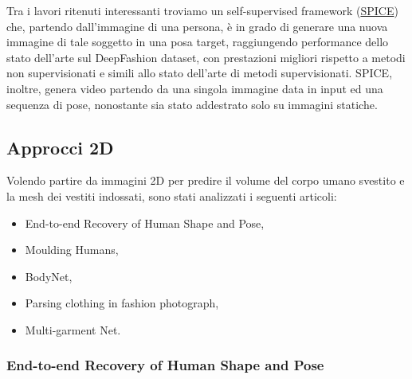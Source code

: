 Tra i lavori ritenuti interessanti troviamo un self-supervised framework (\href{https://openaccess.thecvf.com/content/ICCV2021/papers/Sanyal_Learning_Realistic_Human_Reposing_Using_Cyclic_Self-Supervision_With_3D_Shape_ICCV_2021_paper.pdf}{SPICE}) \cite{sanyal2021learning} che, partendo dall’immagine di una persona, è in grado di generare una nuova immagine di tale soggetto in una posa target, raggiungendo performance dello stato dell’arte sul DeepFashion dataset, con prestazioni migliori rispetto a metodi non supervisionati e simili allo stato dell’arte di metodi supervisionati. SPICE, inoltre, genera video partendo da una singola immagine data in input ed una sequenza di pose, nonostante sia stato addestrato solo su immagini statiche.

\medskip

\subsection{Approcci 2D}

Volendo partire da immagini 2D per predire il volume del corpo umano svestito e la mesh dei vestiti indossati, sono stati analizzati i seguenti articoli:

\begin{itemize}
\item End-to-end Recovery of Human Shape and Pose,
\item Moulding Humans,
\item BodyNet,
\item Parsing clothing in fashion photograph,
\item Multi-garment Net.

\end{itemize}


\subsubsection{End-to-end Recovery of Human Shape and Pose}

